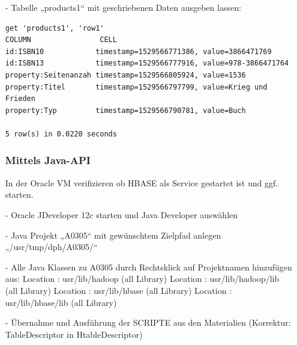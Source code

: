 \begin{itemize}
\item[-] Tabelle „products1“ mit geschriebenen Daten ausgeben lassen:
\begin{lstlisting}
get 'products1', 'row1'
COLUMN                CELL
id:ISBN10            timestamp=1529566771386, value=3866471769
id:ISBN13            timestamp=1529566777916, value=978-3866471764
property:Seitenanzah timestamp=1529566805924, value=1536
property:Titel       timestamp=1529566797799, value=Krieg und Frieden
property:Typ         timestamp=1529566790781, value=Buch

5 row(s) in 0.0220 seconds
\end{lstlisting}

\subsubsection*{Mittels Java-API}
In der Oracle VM verifizieren ob HBASE als Service gestartet ist und ggf. starten.
\item[-]Oracle JDeveloper 12c starten und Java Developer auswählen
\item[-]Java Projekt „A0305“ mit gewünschtem Zielpfad anlegen „/usr/tmp/dph/A0305/“
\item[-]Alle Java Klassen zu A0305 durch Rechtsklick auf Projektnamen hinzufügen aus:
Location : usr/lib/hadoop (all Library)
Location : usr/lib/hadoop/lib (all Library)
Location : usr/lib/hbase (all Library)
Location : usr/lib/hbase/lib (all Library)
\item[-] Übernahme und Ausführung der SCRIPTE aus den Materialien (Korrektur: TableDescriptor in HtableDescriptor)


\end{itemize}
